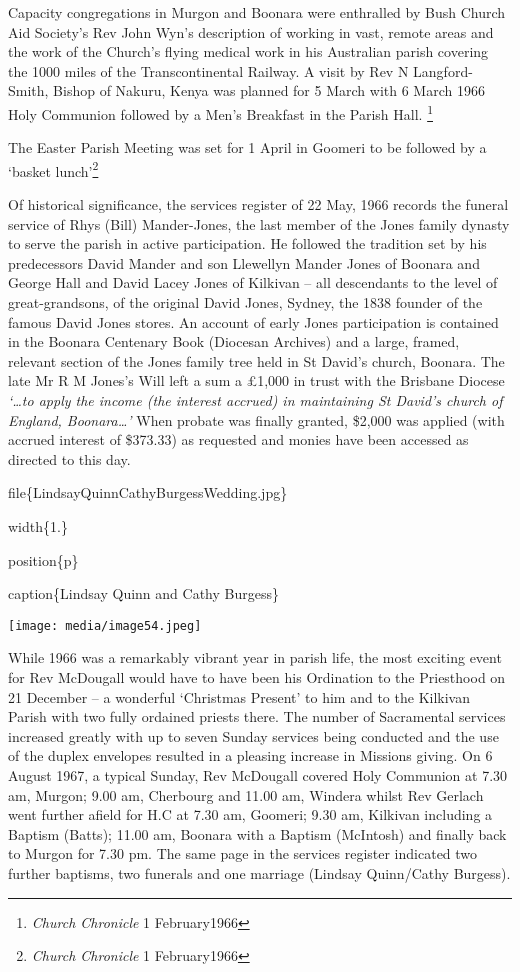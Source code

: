 Capacity congregations in Murgon and Boonara were enthralled by Bush Church Aid Society's Rev John Wyn's description of working in vast, remote areas and the work of the Church's flying medical work in his Australian parish covering the 1000 miles of the Transcontinental Railway. A visit by Rev N Langford-Smith, Bishop of Nakuru, Kenya was planned for 5 March with 6 March 1966 Holy Communion followed by a Men's Breakfast in the Parish Hall. \footnote{\emph{Church Chronicle} 1 February1966}

The Easter Parish Meeting was set for 1 April in Goomeri to be followed by a `basket lunch'\footnote{\emph{Church Chronicle} 1 February1966}

Of historical significance, the services register of 22 May, 1966 records the funeral service of Rhys (Bill) Mander-Jones, the last member of the Jones family dynasty to serve the parish in active participation. He followed the tradition set by his predecessors David Mander and son Llewellyn Mander Jones of Boonara and George Hall and David Lacey Jones of Kilkivan -- all descendants to the level of great-grandsons, of the original David Jones, Sydney, the 1838 founder of the famous David Jones stores. An account of early Jones participation is contained in the Boonara Centenary Book (Diocesan Archives) and a large, framed, relevant section of the Jones family tree held in St David's church, Boonara. The late Mr R M Jones's Will left a sum a £1,000 in trust with the Brisbane Diocese \emph{`\ldots to apply the income (the interest accrued) in maintaining St David's church of England, Boonara\ldots'} When probate was finally granted, \$2,000 was applied (with accrued interest of \$373.33) as requested and monies have been accessed as directed to this day.

file\{LindsayQuinnCathyBurgessWedding.jpg\}

width\{1.\}

position\{p\}

caption\{Lindsay Quinn and Cathy Burgess\}

\texttt{[image: media/image54.jpeg]}

While 1966 was a remarkably vibrant year in parish life, the most exciting event for Rev McDougall would have to have been his Ordination to the Priesthood on 21 December -- a wonderful `Christmas Present' to him and to the Kilkivan Parish with two fully ordained priests there. The number of Sacramental services increased greatly with up to seven Sunday services being conducted and the use of the duplex envelopes resulted in a pleasing increase in Missions giving. On 6 August 1967, a typical Sunday, Rev McDougall covered Holy Communion at 7.30 am, Murgon; 9.00 am, Cherbourg and 11.00 am, Windera whilst Rev Gerlach went further afield for H.C at 7.30 am, Goomeri; 9.30 am, Kilkivan including a Baptism (Batts); 11.00 am, Boonara with a Baptism (McIntosh) and finally back to Murgon for 7.30 pm. The same page in the services register indicated two further baptisms, two funerals and one marriage (Lindsay Quinn/Cathy Burgess).

